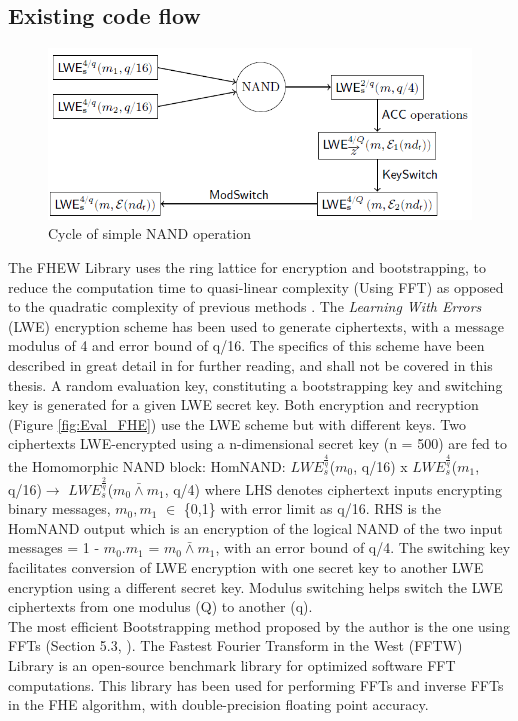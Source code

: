 \subsection{Existing code flow}
\label{4_1_1}
\begin{figure}[h!]
 \centering
 \includegraphics[width=0.8\linewidth]{figures/FHEW.PNG}
 \caption{Cycle of simple NAND operation
 \cite{ducas2015fhew}}
 \label{fig:FHEW}
\end{figure}
The FHEW Library \cite{fhew_lib} uses the ring lattice for encryption and bootstrapping, to reduce the computation time to quasi-linear complexity (Using FFT) as opposed to the quadratic complexity of previous methods \cite{ducas2015fhew}.\newline\newline
The \textit{Learning With Errors} (LWE) encryption scheme has been used to generate ciphertexts, with a message modulus of 4 and error bound of q/16. The specifics of this scheme have been described in great detail in \cite{ducas2015fhew} for further reading, and shall not be covered in this thesis. A random evaluation key, constituting a bootstrapping key and switching key is generated for a given LWE secret key. Both encryption and recryption (Figure \ref{fig:Eval_FHE}) use the LWE scheme but with different keys. Two ciphertexts LWE-encrypted using a n-dimensional secret key (n = 500) are fed to the Homomorphic NAND block:\newline \newline
HomNAND: $LWE_{s}^\frac{4}{q}$($m_0$, q/16) x $LWE_{s}^\frac{4}{q}$($m_1$, q/16)$\rightarrow$ $LWE_{s}^\frac{2}{q}$($m_0 \bar{\wedge} m_1$, q/4)\newline \newline
where LHS denotes ciphertext inputs encrypting binary messages, $m_0, m_1$ $\in$ \{0,1\} with error limit as q/16. RHS is the HomNAND output which is an encryption of the logical NAND of the two input messages = 1 - $m_0.m_1$ = $m_0 \bar{\wedge} m_1$, with an error bound of q/4.
The switching key facilitates conversion of LWE encryption with one secret key to another LWE encryption using a different secret key. Modulus switching helps switch the LWE ciphertexts from one modulus (Q) to another (q). \\The most efficient Bootstrapping method proposed by the author is the one using FFTs (Section 5.3, \cite{ducas2015fhew}). The Fastest Fourier Transform in the West (FFTW) Library \cite{FFTW05} is an open-source benchmark library for optimized software FFT computations. This library has been used for performing FFTs and inverse FFTs in the FHE algorithm, with double-precision floating point accuracy. 
